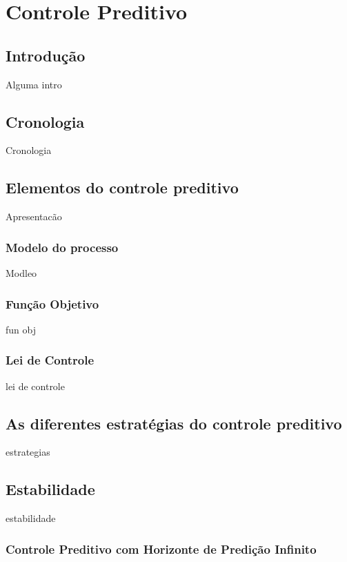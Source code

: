 \chapter{Controle Preditivo}

\section{Introdução}

Alguma intro

\section{Cronologia}

Cronologia

\section{Elementos do controle preditivo}

Apresentacão

\subsection{Modelo do processo}

Modleo 

\subsection{Função Objetivo}

fun obj

\subsection{Lei de Controle}

lei de controle

\section{As diferentes estratégias do controle preditivo}

estrategias

\section{Estabilidade}

estabilidade

\subsection{Controle Preditivo com Horizonte de Predição Infinito}

